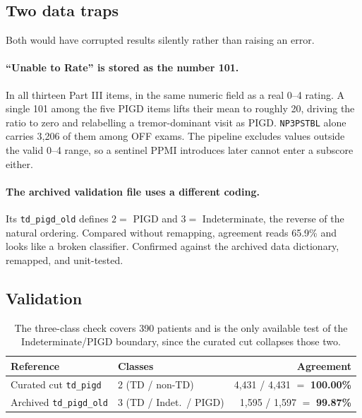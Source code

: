 \documentclass[11pt,a4paper]{article}
\newcommand{\code}[1]{\texttt{\small #1}}
\begin{document}
\subsection{Two data traps}

Both would have corrupted results silently rather than raising an error.

\paragraph{``Unable to Rate'' is stored as the number 101.} In all thirteen
Part III items, in the same numeric field as a real 0--4 rating. A single 101
among the five PIGD items lifts their mean to roughly 20, driving the ratio to
zero and relabelling a tremor-dominant visit as PIGD. \code{NP3PSTBL} alone
carries 3{,}206 of them among OFF exams. The pipeline excludes values outside the
valid 0--4 range, so a sentinel PPMI introduces later cannot enter a subscore
either.

\paragraph{The archived validation file uses a different coding.} Its
\code{td\_pigd\_old} defines $2 =$ PIGD and $3 =$ Indeterminate, the reverse of
the natural ordering. Compared without remapping, agreement reads 65.9\% and
looks like a broken classifier. Confirmed against the archived data dictionary,
remapped, and unit-tested.

\subsection{Validation}

\begin{table}[H]
\centering
\begin{tabular}{@{}llr@{}}
\toprule
\textbf{Reference} & \textbf{Classes} & \textbf{Agreement} \\
\midrule
Curated cut \code{td\_pigd}   & 2 (TD / non-TD)        & 4{,}431 / 4{,}431 $=$ \textbf{100.00\%} \\
Archived \code{td\_pigd\_old} & 3 (TD / Indet.\ / PIGD) & 1{,}595 / 1{,}597 $=$ \textbf{99.87\%} \\
\bottomrule
\end{tabular}
\caption{The three-class check covers 390 patients and is the only available test
of the Indeterminate/PIGD boundary, since the curated cut collapses those two.}
\end{table}
\end{document}
